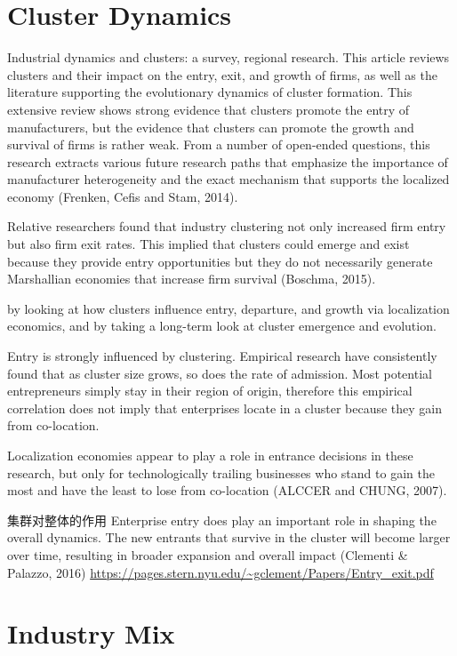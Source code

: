 \documentclass[
  12pt,
  oneside]{book}
\begin{document}
\hypertarget{cluster-dynamics}{%
\section{Cluster Dynamics}\label{cluster-dynamics}}

Industrial dynamics and clusters: a survey, regional research. This article reviews clusters and their impact on the entry, exit, and growth of firms, as well as the literature supporting the evolutionary dynamics of cluster formation. This extensive review shows strong evidence that clusters promote the entry of manufacturers, but the evidence that clusters can promote the growth and survival of firms is rather weak. From a number of open-ended questions, this research extracts various future research paths that emphasize the importance of manufacturer heterogeneity and the exact mechanism that supports the localized economy (Frenken, Cefis and Stam, 2014).

Relative researchers found that industry clustering not only increased firm entry but also firm exit rates. This implied that clusters could emerge and exist because they provide entry opportunities but they do not necessarily generate Marshallian economies that increase firm survival (Boschma, 2015).

by looking at how clusters influence entry, departure, and growth via localization economics, and by taking a long-term look at cluster emergence and evolution.

Entry is strongly influenced by clustering. Empirical research have consistently found that as cluster size grows, so does the rate of admission. Most potential entrepreneurs simply stay in their region of origin, therefore this empirical correlation does not imply that enterprises locate in a cluster because they gain from co-location.

Localization economies appear to play a role in entrance decisions in these research, but only for technologically trailing businesses who stand to gain the most and have the least to lose from co-location (ALCCER and CHUNG, 2007).

集群对整体的作用
Enterprise entry does play an important role in shaping the overall dynamics. The new entrants that survive in the cluster will become larger over time, resulting in broader expansion and overall impact (Clementi \& Palazzo, 2016)
\url{https://pages.stern.nyu.edu/~gclement/Papers/Entry_exit.pdf}

\hypertarget{industry-mix}{%
\section{Industry Mix}\label{industry-mix}}
\end{document}
